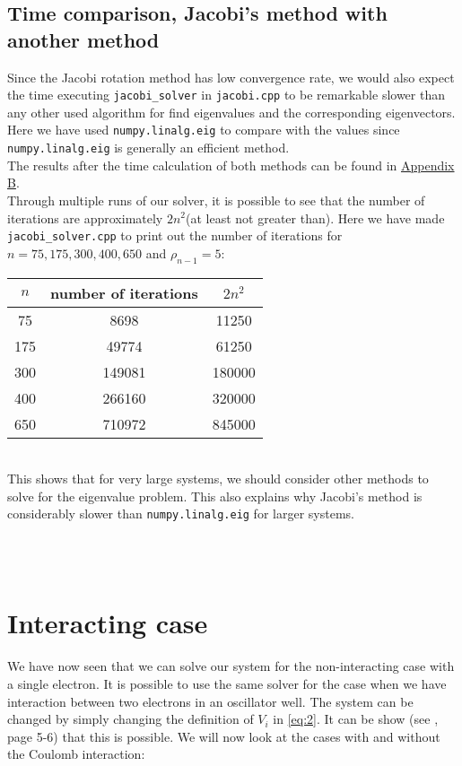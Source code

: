 \documentclass[12pt]{article}
\begin{document}
	 \subsection{Time comparison, Jacobi's method with another method}
	 Since the Jacobi rotation method has low convergence rate, we would also expect the time executing \texttt{jacobi\_solver} in \texttt{jacobi.cpp} to be remarkable slower than any other used algorithm for find eigenvalues and the corresponding eigenvectors. Here we have used \texttt{numpy.linalg.eig} to compare with the values since \texttt{numpy.linalg.eig} is generally an efficient method.\\
	The results after the time calculation of both methods can be found in \hyperref[app:2]{Appendix B}. \\
	 Through multiple runs of our solver, it is possible to see that the number of iterations are approximately $2n^2$(at least not greater than). Here we have made \texttt{jacobi\_solver.cpp} to print out the number of iterations for $n = 75,175,300,400,650 $ and $\rho_{n-1} = 5$: \\ \pagebreak
	\begin{table}[h]
		\centering
			 \begin{tabular}{c | c | c}
			 	$n$ & number of iterations & $2n^2$\\ \hline
			 	75 & 8698 &11250\\ \hline
			 	175 & 49774 &61250\\\hline
			 	300 & 149081 &180000\\\hline
			 	400 & 266160 &320000\\\hline
			 	650 & 710972 & 845000\\
			 \end{tabular}\\
			 \footnotesize
			 	 This shows that for very large systems, we should consider other methods to solve for the eigenvalue problem. This also explains why Jacobi's method is considerably slower than \texttt{numpy.linalg.eig} for larger systems. 
	\end{table} \\ 
	 \\ \pagebreak
	\section{Interacting case}
	We have now seen that we can solve our system for the non-interacting case with a single electron. It is possible to use the same solver for the case when we have interaction between two electrons in an oscillator well. The system can be changed by simply changing the definition of $V_i$ in \ref{eq:2}. It can be show (see \cite{projectDesc}, page 5-6) that this is possible. We will now look at the cases with and without the Coulomb interaction: 
\end{document}
